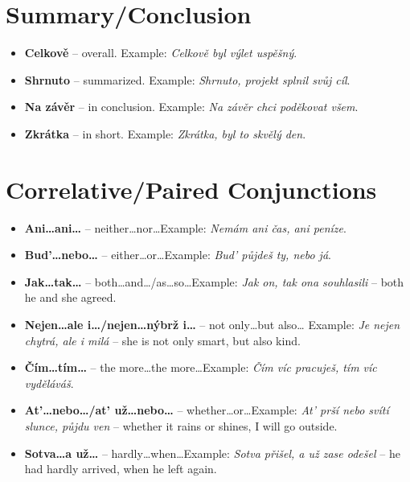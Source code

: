\documentclass[12pt]{book}
\begin{document}
\section{Summary/Conclusion}
\begin{itemize}
    \item \textbf{Celkově} -- overall. Example: \emph{Celkově byl výlet uspěšný}.
    \item \textbf{Shrnuto} -- summarized. Example: \emph{Shrnuto, projekt splnil svůj cíl}.
    \item \textbf{Na závěr} -- in conclusion. Example: \emph{Na závěr chci poděkovat všem}.
    \item \textbf{Zkrátka} -- in short. Example: \emph{Zkrátka, byl to skvělý den}.
\end{itemize}

\section{Correlative/Paired Conjunctions}
\begin{itemize}
    \item \textbf{Ani\dots ani\dots} -- neither\dots nor\dots Example: \emph{Nemám ani čas, ani peníze}.
    \item \textbf{Bud'\dots nebo\dots} -- either\dots or\dots Example: \emph{Bud' půjdeš ty, nebo já}.
    \item \textbf{Jak\dots tak\dots} -- both\dots and\dots/as\dots so\dots Example: 
        \emph{Jak on, tak ona souhlasili} -- both he and she agreed.

    \item \textbf{Nejen\dots ale i\dots/nejen\dots nýbrž i\dots} -- not only\dots but also\dots
        Example: \emph{Je nejen chytrá, ale i milá} -- she is not only smart, but also kind.
    
    \item \textbf{Čím\dots tím\dots} -- the more\dots the more\dots Example: 
        \emph{Čím víc pracuješ, tím víc vyděláváš}.
    
    \item \textbf{At'\dots nebo\dots/at' už\dots nebo\dots} -- whether\dots or\dots Example:
        \emph{At' prší nebo svítí slunce, půjdu ven} -- whether it rains or shines, I will go outside.
    
    \item \textbf{Sotva\dots a už\dots} -- hardly\dots when\dots Example: 
        \emph{Sotva přišel, a už zase odešel} -- he had hardly arrived, when he left again.
\end{itemize}
\end{document}
